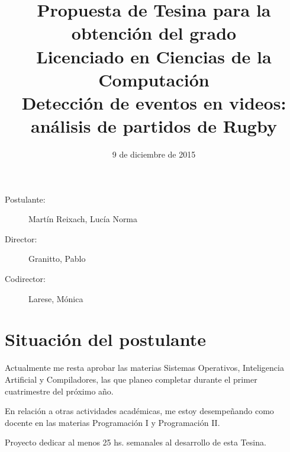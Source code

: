 \documentclass[11pt]{article}
\begin{document}
\date{9 de diciembre de 2015}
\title{Propuesta de Tesina para la obtención del grado \\ Licenciado en Ciencias de la Computación
\\ Detección de eventos en videos: análisis de partidos de Rugby}
\maketitle

\begin{description}
  \item[Postulante:] Martín Reixach, Lucía Norma
  \item[Director:] Granitto, Pablo
  \item[Codirector:] Larese, Mónica
\end{description}

\section{Situación del postulante}
Actualmente me resta aprobar las materias Sistemas Operativos, Inteligencia Artificial y Compiladores,
las que planeo completar durante el primer cuatrimestre del próximo año.

En relación a otras actividades académicas, me estoy desempeñando como docente en las materias Programación I y Programación II.

Proyecto dedicar al menos 25 hs. semanales al desarrollo de esta Tesina.








\nocite{*}

\end{document}
